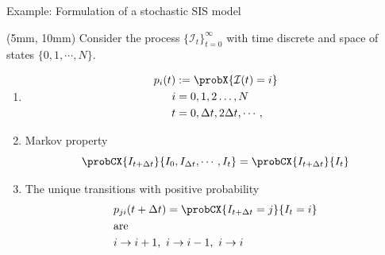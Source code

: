 %
%
%
\begin{frame}{Example: Formulation of a stochastic SIS model}
    \begin{textblock*}{55mm}(5mm, 10mm)
        Consider the process $\{\mathcal{I}_t\}_{t=0} ^ \infty$ with 
        time discrete and space of states $\{0,1,\cdots, N \}$.
        \begin{enumerate}[(H-1)]
            \item <2->
                \begin{align*}
                    p_i(t) &:= \probX{\mathcal{I}(t) = i}
                    \\
                    i &= 0,1,2\dots, N
                    \\
                    t &= 0, \Delta t, 2 \Delta t, \cdots,
                \end{align*}
            \item <3->
                Markov property
                $$
                    \probCX{I_{t + \Delta t}}{  I_0, I_{\Delta t}, \cdots, I_t}
                    =\probCX{I_{t + \Delta t} }{I_t}
                $$
            \item <4->
                The unique transitions with positive 
                probability
                \begin{align*}
                    & p_{ji}(t + \Delta t)
                    = 
                    \probCX{I_{t + \Delta t} = j}{I_t = i}
                    \\
                    &\text{are}
                    \\
                    & i \to i+1, \ i \to i-1,  \ i \to i
                \end{align*}
        \end{enumerate}
    \end{textblock*}
    \only<5->{
        \begin{textblock*}{50mm}(55mm, 10mm)
            \begin{equation*}
                p_{ji}(\Delta t):=
                    \begin{cases}
                        \frac{\beta i (N - i)}{N} \Delta t, 
                            & j = i + 1
                        \\
                        (b + \gamma) i \Delta t, 
                            & j = i - 1
                        \\
                        1 - 
                        \left[
                            \frac{\beta i (N - i)}{N} +

\end{cases}
\end{equation*}
\end{textblock*}}
\end{frame}
